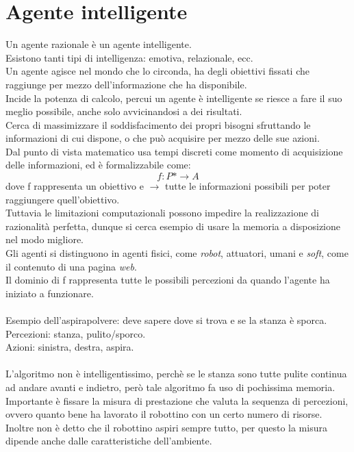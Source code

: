 \documentclass[10pt,a4paper]{book}
\begin{document}
\section{Agente intelligente}
Un agente razionale \`e un agente intelligente.\\
Esistono tanti tipi di intelligenza: emotiva, relazionale, ecc.\\
Un agente agisce nel mondo che lo circonda, ha degli obiettivi fissati che raggiunge per mezzo dell'informazione che ha disponibile.\\
Incide la potenza di calcolo, percui un agente \`e intelligente se riesce a fare il suo meglio possibile, anche solo avvicinandosi a dei risultati.\\
Cerca di massimizzare il soddisfacimento dei propri bisogni sfruttando le informazioni di cui dispone, o che pu\`o acquisire per mezzo delle sue azioni.\\
Dal punto di vista matematico usa tempi discreti come momento di acquisizione delle informazioni, ed \`e  formalizzabile come:
\begin{equation}
f:\textit{P*} \longrightarrow \textit{A}
\end{equation}
dove f rappresenta un obiettivo e $\longrightarrow$ tutte le informazioni possibili per poter raggiungere quell'obiettivo.\\
Tuttavia le limitazioni computazionali possono impedire la realizzazione di razionalit\`a perfetta, dunque si cerca esempio di usare la memoria a disposizione nel modo migliore.\\
Gli agenti si distinguono in agenti fisici, come \textit{robot}, attuatori, umani e \textit{soft}, come il contenuto di una pagina \textit{web}.\\
Il dominio di f rappresenta tutte le possibili percezioni da quando l'agente ha iniziato a funzionare.
\\\\
Esempio dell'aspirapolvere: deve sapere dove si trova e se la stanza \`e sporca.\\
Percezioni: stanza, pulito/sporco.\\
Azioni: sinistra, destra, aspira.\\
\\
L'algoritmo non \`e intelligentissimo, perch\`e se le stanza sono tutte pulite continua ad andare avanti e indietro, per\`o tale algoritmo fa uso di pochissima memoria.\\
Importante \`e fissare la misura di prestazione che valuta la sequenza di percezioni, ovvero quanto bene ha lavorato il robottino con un certo numero di risorse. Inoltre non \`e detto che il robottino aspiri sempre tutto, per questo la misura dipende anche dalle caratteristiche dell'ambiente.
\end{document}
